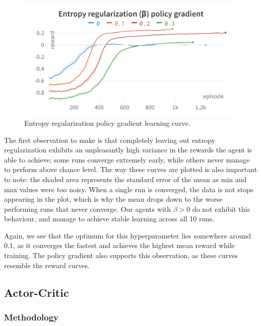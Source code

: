 \documentclass{article}
\begin{document}
\begin{figure}[htbp]
    \centering
    \includegraphics[width=\linewidth]{figs/ER-PG.png}
    \caption{Entropy regularization policy gradient learning curve.}
    \label{fig:er-pg}
\end{figure}

The first observation to make is that completely leaving out entropy regularization exhibits an unpleasantly high variance in the rewards the agent is able to achieve; some runs converge extremely early, while others never manage to perform above chance level.
The way these curves are plotted is also important to note: the shaded area represents the standard error of the mean as min and max values were too noisy.
When a single run is converged, the data is not stops appearing in the plot, which is why the mean drops down to the worse performing runs that never converge.
Our agents with $\beta > 0$ do not exhibit this behaviour, and manage to achieve stable learning across all 10 runs.

Again, we see that the optimum for this hyperparameter lies somewhere around 0.1, as it converges the fastest and achieves the highest mean reward while training.
The policy gradient also supports this observation, as these curves resemble the reward curves.

\subsection{Actor-Critic}
\label{A-Actor-Critic}


\subsubsection{Methodology}
\label{AC-Method}
\end{document}
